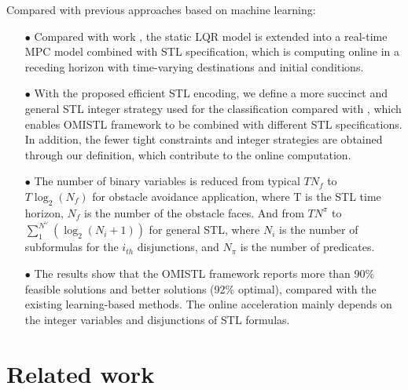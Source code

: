 \documentclass[a4paper]{report}
\begin{document}
Compared with previous approaches based on machine learning:

\begin{itemize} 
    \item[$\bullet$]Compared with work \cite{bertsimas2022online}, the static LQR model is extended into a real-time MPC model combined with STL specification, which is computing online in a receding horizon with time-varying destinations and initial conditions.
\end{itemize}

\begin{itemize} 
    \item[$\bullet$]With the proposed efficient STL encoding, we define a more succinct and general STL integer strategy used for the classification compared with \cite{bertsimas2022online}\cite{Cauligi2020}, which enables OMISTL framework to be combined with different STL specifications. In addition, the fewer tight constraints and integer strategies are obtained through our definition, which contribute to the online computation.
\end{itemize}

\begin{itemize}
    \item[$\bullet$]The number of binary variables is reduced from typical $TN_f$ to $T\log_2(N_f)$ for obstacle avoidance application, where T is the STL time horizon, $N_f$ is the number of the obstacle faces. And from $TN^\pi$ to $\sum_{1}^{N^\lor}(\log_2(N_i+1))$ for general STL, where $N_i$ is the number of subformulas for the $i_{th}$ disjunctions, and $N_{\pi}$ is the number of predicates.
\end{itemize}

\begin{itemize} 
    \item[$\bullet$] The results show that the OMISTL framework reports more than 90\% feasible solutions and better solutions (92\% optimal), compared with the existing learning-based methods. The online acceleration mainly depends on the integer variables and disjunctions of STL formulas.
\end{itemize}

\section{Related work}
\end{document}
